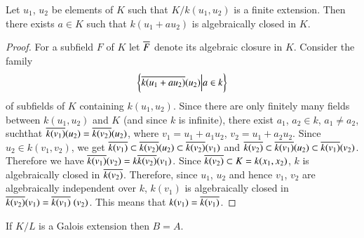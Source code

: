 \begin{lemma}\label{part2:chap6:sec21:lem21.10}
  Let $u_1$, $u_2$ be elements of $K$ such that $K/k(u_1, u_2)$ is a
  finite extension. Then there exists $a \in K$ such that $k(u_1+
  au_2)$ is algebraically closed in $K$.
\end{lemma}

\begin{proof}
  For a subfield $F$ of $K$ let $\overline{F}$ denote its algebraic closure
  in $K$. Consider the family
$$
\left\{ \overline{k (u_1 + au_2)} (u_2)\Big| a \in k \right\}
$$
of subfields of $K$ containing $k(u_1, u_2)$. Since there are only
finitely many fields between $k(u_1, u_2)$ and $K$ (and since $k$ is
infinite), there exist $a_1$, $a_2 \in k$, $a_1 \neq a_2$,
such\pageoriginale that $\overline{k (v_1)} (u_2)= \overline{k(v_2)} (u_2)$, where
$v_1 = u_1 + a_1 u_2$, $v_2= u_1+ a_2 u_2$. Since $u_2 \in k (v_1 ,
v_2)$, we get $\overline{k(v_1)} \subset \overline{k(v_2)} (u_2) \subset \overline{k
  (v_2)} (v_1)$ and $\overline{k (v_2)} \subset \overline{k(v_1)} (u_2) \subset
\overline{k (v_1)} (v_2)$. Therefore we have $\overline{k (v_1)} (v_2)= k\overline{k
  (v_2)} (v_1)$. Since $\overline{k(v_2)} \subset K = k (x_1, x_2)$, $k$ is
algebraically closed in $\overline{k (v_2)}$. Therefore, since $u_1$, $u_2$
and hence $v_1$, $v_2$ are algebraically independent over $k$,
$k(v_1)$ is algebraically closed in $\overline{k (v_2)} (v_1)= \overline{k (v_1)} \;
  (v_2)$. This means that $k(v_1)= \overline{k(v_1)}$.
\end{proof}

\begin{thm}\label{part2:chap6:sec21:thm21.11}
  If $K/L$ is a Galois extension then $B=A$.
\end{thm}


